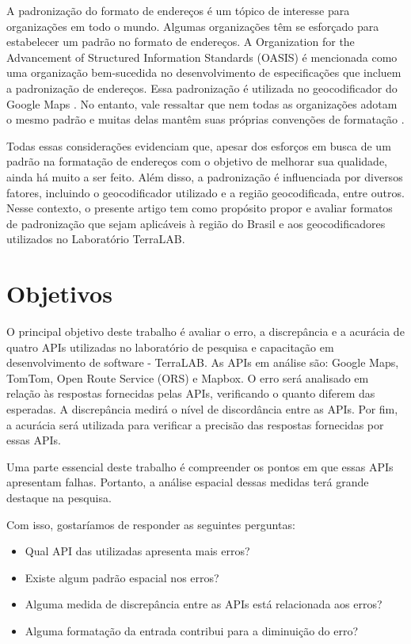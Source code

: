 A padronização do formato de endereços é um tópico de interesse para organizações em todo o mundo. Algumas organizações têm se esforçado para estabelecer um padrão no formato de endereços. A Organization for the Advancement of Structured Information Standards (OASIS) é mencionada como uma organização bem-sucedida no desenvolvimento de especificações que incluem a padronização de endereços. Essa padronização é utilizada no geocodificador do Google Maps \cite{GoogleDoc}. No entanto, vale ressaltar que nem todas as organizações adotam o mesmo padrão e muitas delas mantêm suas próprias convenções de formatação \cite{behr2010}.

Todas essas considerações evidenciam que, apesar dos esforços em busca de um padrão na formatação de endereços com o objetivo de melhorar sua qualidade, ainda há muito a ser feito. Além disso, a padronização é influenciada por diversos fatores, incluindo o geocodificador utilizado e a região geocodificada, entre outros. Nesse contexto, o presente artigo tem como propósito propor e avaliar formatos de padronização que sejam aplicáveis à região do Brasil e aos geocodificadores utilizados no Laboratório TerraLAB.


\section{Objetivos}

O principal objetivo deste trabalho é avaliar o erro, a discrepância e a acurácia de quatro APIs utilizadas no laboratório de pesquisa e capacitação em desenvolvimento de software - TerraLAB. As APIs em análise são: Google Maps, TomTom, Open Route Service (ORS) e Mapbox. O erro será analisado em relação às respostas fornecidas pelas APIs, verificando o quanto diferem das esperadas. A discrepância medirá o nível de discordância entre as APIs. Por fim, a acurácia será utilizada para verificar a precisão das respostas fornecidas por essas APIs.
    
Uma parte essencial deste trabalho é compreender os pontos em que essas APIs apresentam falhas. Portanto, a análise espacial dessas medidas terá grande destaque na pesquisa.

Com isso, gostaríamos de responder as seguintes perguntas:
\begin{itemize}
   \item Qual API das utilizadas apresenta mais erros?
   \item Existe algum padrão espacial nos erros?
   \item Alguma medida de discrepância entre as APIs está relacionada aos erros?
   \item Alguma formatação da entrada contribui para a diminuição do erro?
\end{itemize}

